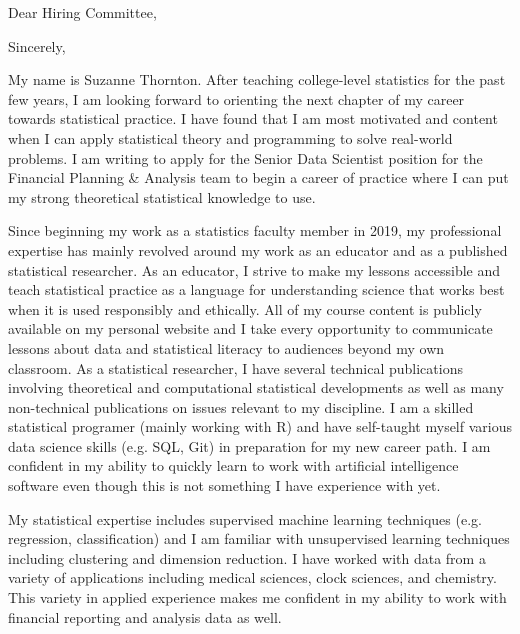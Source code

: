 \documentclass[11pt,a4paper,sans]{moderncv}
\begin{document}
	
	\date{\today }
	\opening{Dear Hiring Committee,}
	\closing{Sincerely,}
	\makelettertitle
	
	
	
	
	
	My name is Suzanne Thornton. After teaching college-level statistics for the past few years, I am looking forward to orienting the next chapter of my career towards statistical practice. I have found that I am most motivated and content when I can apply statistical theory and programming to solve real-world problems. I am writing to apply for the Senior Data Scientist position for the Financial Planning \& Analysis team to begin a career of practice where I can put my strong theoretical statistical knowledge to use.\\ \vspace{.5cm}

Since beginning my work as a statistics faculty member in 2019, my professional expertise has mainly revolved around my work as an educator and as a published statistical researcher. As an educator, I strive to make my lessons accessible and teach statistical practice as a language for understanding science that works best when it is used responsibly and ethically. All of my course content is publicly available on my personal website and I take every opportunity to communicate lessons about data and statistical literacy to audiences beyond my own classroom. As a statistical researcher, I have several technical publications involving theoretical and computational statistical developments as well as many non-technical publications on issues relevant to my discipline. I am a skilled statistical programer (mainly working with R) and have self-taught myself various data science skills (e.g. SQL, Git) in preparation for my new career path. I am confident in my ability to quickly learn to work with artificial intelligence software even though this is not something I have experience with yet. 

My statistical expertise includes supervised machine learning techniques (e.g. regression, classification) and I am familiar with unsupervised learning techniques including clustering and dimension reduction. I have worked with data from a variety of applications including medical sciences, clock sciences, and chemistry. This variety in applied experience makes me confident in my ability to work with financial reporting and analysis data as well. 
\end{document}
